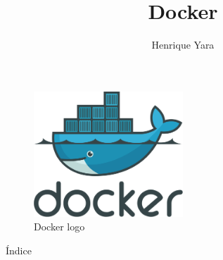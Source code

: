 \documentclass{beamer}
\title {Docker}
\author {Henrique Yara}
\institute {opus-software}
\begin{document}
\begin{frame}{\titlepage}
	\begin{figure}[htpb]
		\centering
		\includegraphics[width=0.5\textwidth]{./assets/Docker_logo.png}
		\caption{Docker logo}
	\end{figure}
\end{frame}

\begin{frame}{Índice}
	\tableofcontents
\end{frame}















\end{document}

